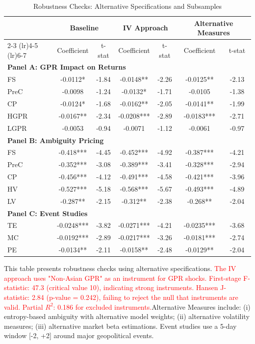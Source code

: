 \documentclass[preprint,12pt,authoryear]{elsarticle}
\begin{document}
\begin{table}[htbp]
\centering
\caption{Robustness Checks: Alternative Specifications and Subsamples}
\label{tab:robustness}
\begin{threeparttable}
\begin{tabular*}{\textwidth}{@{\extracolsep{\fill}} lcccccc @{\extracolsep{\fill}}}
\toprule
& \multicolumn{2}{c}{Baseline} & \multicolumn{2}{c}{IV Approach} & \multicolumn{2}{c}{Alternative Measures} \\
\cmidrule(lr){2-3} \cmidrule(lr){4-5} \cmidrule(lr){6-7}
& Coefficient & t-stat & Coefficient & t-stat & Coefficient & t-stat \\
\midrule
\midrule
\multicolumn{7}{l}{\textbf{Panel A: GPR Impact on Returns}} \\
FS & -0.0112* & -1.84 & -0.0148** & -2.26 & -0.0125** & -2.13 \\
PreC & -0.0098 & -1.24 & -0.0132* & -1.71 & -0.0105 & -1.38 \\
CP & -0.0124* & -1.68 & -0.0162** & -2.05 & -0.0141** & -1.99 \\
HGPR & -0.0167** & -2.34 & -0.0208*** & -2.89 & -0.0183*** & -2.71 \\
LGPR & -0.0053 & -0.94 & -0.0071 & -1.12 & -0.0061 & -0.97 \\
\midrule
\multicolumn{7}{l}{\textbf{Panel B: Ambiguity Pricing}} \\
FS & -0.418*** & -4.45 & -0.452*** & -4.92 & -0.387*** & -4.21 \\
PreC & -0.352*** & -3.08 & -0.389*** & -3.41 & -0.328*** & -2.94 \\
CP & -0.456*** & -4.12 & -0.491*** & -4.58 & -0.421*** & -3.96 \\
HV & -0.527*** & -5.18 & -0.568*** & -5.67 & -0.493*** & -4.89 \\
LV & -0.287** & -2.15 & -0.312** & -2.38 & -0.268** & -2.04 \\
\midrule
\multicolumn{7}{l}{\textbf{Panel C: Event Studies}} \\
TE & -0.0248*** & -3.82 & -0.0271*** & -4.21 & -0.0235*** & -3.68 \\
MC & -0.0192*** & -2.89 & -0.0217*** & -3.26 & -0.0181*** & -2.74 \\
PE & -0.0134** & -2.11 & -0.0158** & -2.48 & -0.0129** & -2.04 \\
\bottomrule
\end{tabular*}
\begin{tablenotes}[flushleft]
\small
\item[] This table presents robustness checks using alternative specifications. \textcolor{red}{The IV approach uses "Non-Asian GPR" as an instrument for GPR shocks. First-stage F-statistic: 47.3 (critical value 10), indicating strong instruments. Hansen J-statistic: 2.84 (p-value = 0.242), failing to reject the null that instruments are valid. Partial $R^2$: 0.186 for excluded instruments.}Alternative Measures include: (i) entropy-based ambiguity with alternative model weights; (ii) alternative volatility measures; (iii) alternative market beta estimations. Event studies use a 5-day window [-2, +2] around major geopolitical events.

\end{tablenotes}
\end{threeparttable}
\end{table}
\end{document}
